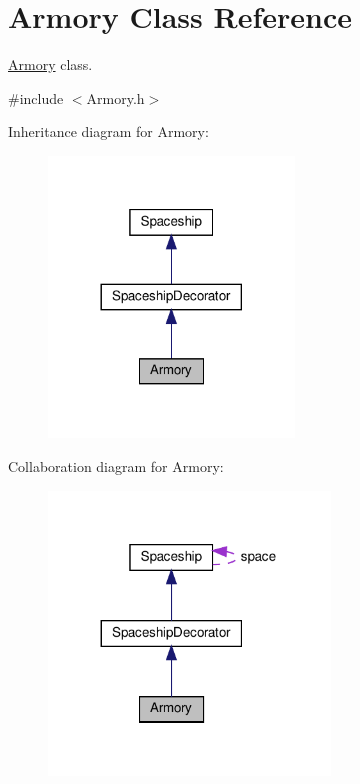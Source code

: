 \hypertarget{classArmory}{}\section{Armory Class Reference}
\label{classArmory}


\hyperlink{classArmory}{Armory} class.  




{\ttfamily \#include $<$Armory.\+h$>$}



Inheritance diagram for Armory\+:\nopagebreak
\begin{figure}[H]
\begin{center}
\leavevmode
\includegraphics[width=185pt]{classArmory__inherit__graph}
\end{center}
\end{figure}


Collaboration diagram for Armory\+:\nopagebreak
\begin{figure}[H]
\begin{center}
\leavevmode
\includegraphics[width=212pt]{classArmory__coll__graph}
\end{center}
\end{figure}
